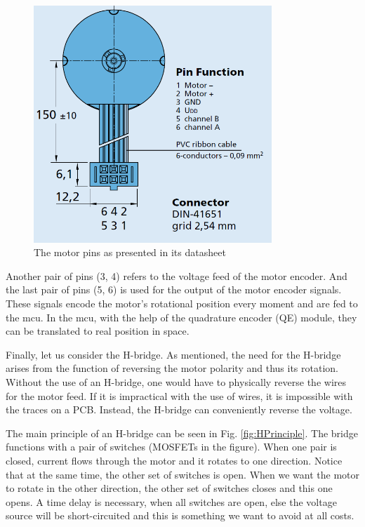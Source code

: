 \begin{figure}[htb]
    \centering
    \includegraphics[width=0.8\textwidth]{figures/hardware/motor.PNG}
    \caption{The motor pins as presented in its datasheet}
    \label{fig:motorPins}
\end{figure}

\FloatBarrier

Another pair of pins (3, 4) refers to the voltage feed of the motor encoder. And the last pair of pins (5, 6) is used for the output of the motor encoder signals. These signals encode the motor's rotational position every moment and are fed to the mcu. In the mcu, with the help of the quadrature encoder (QE) module, they can be translated to real position in space.

Finally, let us consider the H-bridge. As mentioned, the need for the H-bridge arises from the function of reversing the motor polarity and thus its rotation. Without the use of an H-bridge, one would have to physically reverse the wires for the motor feed. If it is impractical with the use of wires, it is impossible with the traces on a PCB. Instead, the H-bridge can conveniently reverse the voltage. 

The main principle of an H-bridge can be seen in Fig. \ref{fig:HPrinciple}. The bridge functions with a pair of switches (MOSFETs in the figure). When one pair is closed, current flows through the motor and it rotates to one direction. Notice that at the same time, the other set of switches is open. When we want the motor to rotate in the other direction, the other set of switches closes and this one opens. A time delay is necessary, when all switches are open, else the voltage source will be short-circuited and this is something we want to avoid at all costs.

